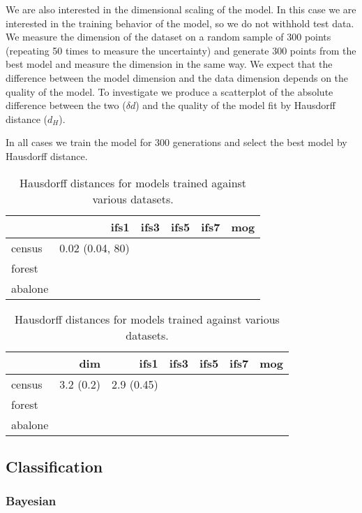\documentclass[11pt]{article}
\theoremstyle{definition}
\begin{document}
We are also interested in the dimensional scaling of the model. In this case we are interested in the training behavior of the model, so we do not withhold test data. We measure the dimension of the dataset on a random sample of 300 points (repeating 50 times to measure the uncertainty) and generate 300 points from the best model and measure the dimension in the same way. We expect that the difference between the model dimension and the data dimension depends on the quality of the model. To investigate we produce a scatterplot of the absolute difference between the two ($\delta d$) and the quality of the model fit by Hausdorff distance ($d_H$). 

In all cases we train the model for 300 generations and select the best model by Hausdorff distance. 

\begin{table}
\begin{tabular}{l | r r r r | r |}
\hline
 & ifs1 & ifs3 & ifs5 & ifs7 & mog \\
\hline
census & 0.02 (0.04, 80) & & & & \\
forest & & & & & \\
abalone & & & & & \\
\hline

\end{tabular}
\caption{Hausdorff distances for models trained against various datasets.}
\label{tablelabel}
\end{table}

\begin{table}
\begin{tabular}{l | r r r r r | r |}
\hline
  & dim & ifs1 & ifs3 & ifs5 & ifs7 & mog \\
\hline
census & 3.2 (0.2) & 2.9 (0.45) & & & & \\
forest & & & & & & \\
abalone & & & & & & \\
\hline

\end{tabular}
\caption{Hausdorff distances for models trained against various datasets.}
\label{tablelabel}
\end{table}

\subsection{Classification}

\subsubsection{Bayesian}
\end{document}
